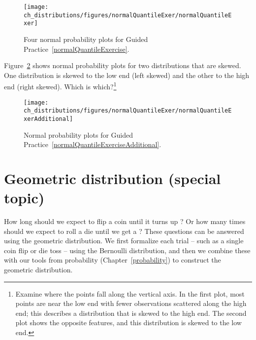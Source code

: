 \begin{figure}
\centering
\texttt{[image: ch\_distributions/figures/normalQuantileExer/normalQuantileExer]}
\caption{Four normal probability plots for Guided Practice~\ref{normalQuantileExercise}.}
\label{normalQuantileExer}
\end{figure}


\begin{exercise} \label{normalQuantileExerciseAdditional}
Figure~\ref{normalQuantileExerAdditional} shows normal probability plots for two distributions that are skewed. One distribution is skewed to the low end (left skewed) and the other to the high end (right skewed). Which is which?\footnote{Examine where the points fall along the vertical axis. In the first plot, most points are near the low end with fewer observations scattered along the high end; this describes a distribution that is skewed to the high end. The second plot shows the opposite features, and this distribution is skewed to the low end.}
\end{exercise}

\begin{figure}
\centering
\texttt{[image: ch\_distributions/figures/normalQuantileExer/normalQuantileExerAdditional]}
\caption{Normal probability plots for Guided Practice~\ref{normalQuantileExerciseAdditional}.}
\label{normalQuantileExerAdditional}
\end{figure}




\section{Geometric distribution (special topic)}
\label{geomDist}

How long should we expect to flip a coin until it turns up ? Or how many times should we expect to roll a die until we get a ? These questions can be answered using the geometric distribution. We first formalize each trial -- such as a single coin flip or die toss -- using the Bernoulli distribution, and then we combine these with our tools from probability (Chapter~\ref{probability}) to construct the geometric distribution.

